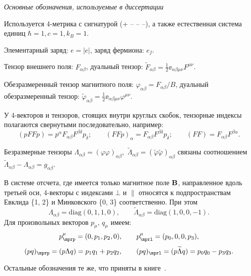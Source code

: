 \newpage

{\it Основные обозначения, используемые в диссертации}

\bigskip

Используется 4-метрика с сигнатурой (+ -- -- --), 
а также естественная система единиц $\hbar = 1, c = 1, k_B = 1$.

Элементарный заряд: $e = |e|$, заряд фермиона: $e_f$.

Тензор внешнего поля: $F_{\alpha \beta}$, 
дуальный тензор: 
${\tilde F}_{\alpha \beta} = \frac{1}{2} \ee_{\alpha \beta
\mu \nu} F^{\mu \nu}$.

Обезразмеренный тензор магнитного поля: 
$\varphi_{\alpha \beta} =  F_{\alpha \beta} /B$,  
дуальный обезразмеренный тензор:
${\tilde \varphi}_{\alpha \beta} = \frac{1}{2} \ee_{\alpha \beta
\mu \nu} \varphi^{\mu \nu}$.

У 4-векторов и тензоров, стоящих внутри круглых скобок, тензорные индексы 
полагаются свернутыми последовательно, например:
%
$$(p F F p) = p^{\alpha} F_{\alpha 
\beta} F^{\beta \delta} p_{\delta}; \qquad
(F F p)_\alpha = F_{\alpha 
\beta} F^{\beta \delta} p_{\delta}; \qquad
(F F) = F_{\alpha \beta} F^{\beta \alpha}.$$

Безразмерные тензоры
$\Lambda_{\alpha \beta} = (\varphi \varphi)_{\alpha \beta}$,\,  
$\widetilde \Lambda_{\alpha \beta} = 
(\tilde \varphi \tilde \varphi)_{\alpha \beta}$ связаны соотношением
$\widetilde \Lambda_{\alpha \beta} - \Lambda_{\alpha \beta} = 
g_{\alpha \beta}$.
 
В системе отсчета, где имеется только магнитное поле $\bf B$, направленное 
вдоль третьей оси, 4-векторы с индексами $\bot$ и $\parallel$ относятся 
к подпространствам Евклида \{1, 2\} и Минковского \{0, 3\} соответственно.
При этом 
%
$$\Lambda_{\alpha \beta} = \mbox{diag}(0, 1, 1, 0), \qquad 
\widetilde \Lambda_{\alpha \beta} = \mbox{diag}(1, 0, 0, -1).$$
% 
Для произвольных векторов $p_\mu$, $q_\mu$ имеем:
%
$$p_{\mprp}^\mu = (0, p_1, p_2, 0), \qquad p_{\mprl}^\mu = (p_0, 0, 0, p_3),$$
%
$$(pq)_{\mprp} = (p \Lambda q) =  p_1 q_1 + p_2 q_2, \qquad 
(pq)_{\mprl} = (p \widetilde \Lambda q) = p_0 q_0 - p_3 q_3.$$  

Остальные обозначения те же, что приняты в книге~\cite{landau3}.
